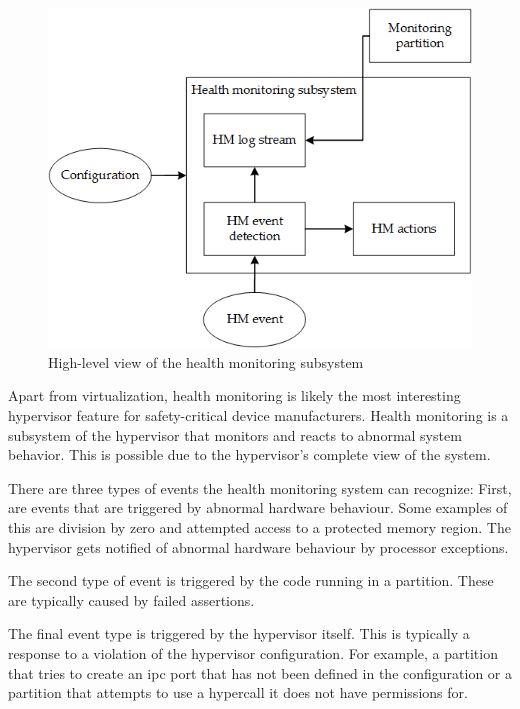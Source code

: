 \begin{figure}[hb!]
\centering
\includegraphics[scale=0.50]{Figures/health_monitoring.png}
\decoRule
\caption{High-level view of the health monitoring subsystem}
\label{fig:health_monitoring}
\end{figure}
Apart from virtualization, health monitoring is likely the most interesting hypervisor feature for safety-critical device manufacturers. Health monitoring is a subsystem of the hypervisor that monitors and reacts to abnormal system behavior. This is possible due to the hypervisor's complete view of the system.

There are three types of events the health monitoring system can recognize: First, are events that are triggered by abnormal hardware behaviour. Some examples of this are division by zero and attempted access to a protected memory region. The hypervisor gets notified of abnormal hardware behaviour by processor exceptions.

The second type of event is triggered by the code running in a partition. These are typically caused by failed assertions. 

The final event type is triggered by the hypervisor itself. This is typically a response to a violation of the hypervisor configuration. For example, a partition that tries to create an \acrshort{ipc} port that has not been defined in the configuration or a partition that attempts to use a hypercall it does not have permissions for.

